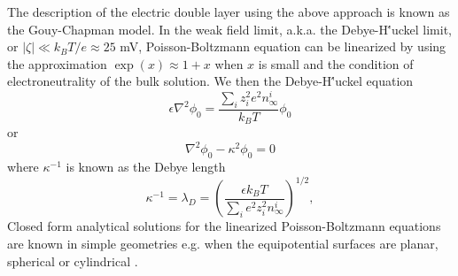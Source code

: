 The description of the electric double layer using the above approach is known as the Gouy-Chapman model\cite{ghosal2006electrokinetic}. 
In the weak field limit, a.k.a. the Debye-H\''{u}ckel limit, or $|\zeta|\ll k_BT/e\approx 25$ mV, Poisson-Boltzmann equation can be linearized by using the approximation $\exp (x ) \approx 1 + x$ when $x$ is small and the condition of electroneutrality of the bulk solution. We then the Debye-H\''{u}ckel equation 
\begin{equation}
\epsilon \nabla^2\phi_0 = \frac{\sum_i z_i^2 e^2 n_\infty^i}{k_BT} \phi_0
\end{equation}
or
\begin{equation} 
\nabla^2\phi_0 - \kappa^2 \phi_0 = 0
\end{equation}
where $\kappa^{-1}$ is known as the Debye length
\begin{equation}
\kappa^{-1}=\lambda_D=\left(\frac{\epsilon k_BT}{\sum_i e^2 z_i^2n_\infty^i}\right)^{1/2},
\end{equation}
Closed form analytical solutions for the linearized Poisson-Boltzmann equations are known in simple geometries e.g. when the equipotential surfaces are planar, spherical or cylindrical \cite{ghosal2006electrokinetic,ghosal2010mathematical}. 

